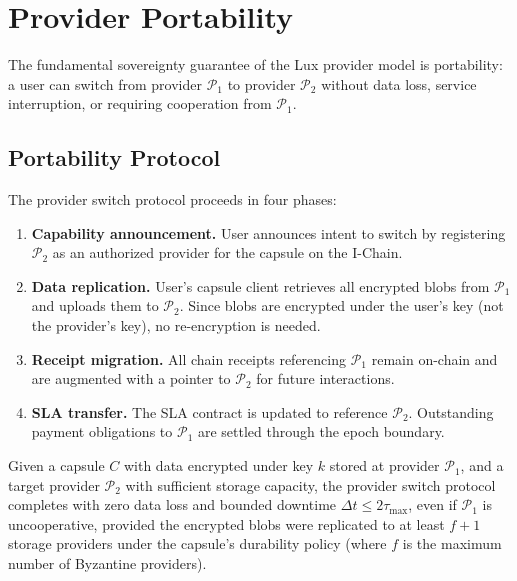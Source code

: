 \section{Provider Portability}
\label{sec:portability}

The fundamental sovereignty guarantee of the Lux provider model is
portability: a user can switch from provider $\mathcal{P}_1$ to
provider $\mathcal{P}_2$ without data loss, service interruption,
or requiring cooperation from $\mathcal{P}_1$.

\subsection{Portability Protocol}

The provider switch protocol proceeds in four phases:

\begin{enumerate}
    \item \textbf{Capability announcement.} User announces intent to switch
    by registering $\mathcal{P}_2$ as an authorized provider for the capsule
    on the I-Chain.

    \item \textbf{Data replication.} User's capsule client retrieves all
    encrypted blobs from $\mathcal{P}_1$ and uploads them to $\mathcal{P}_2$.
    Since blobs are encrypted under the user's key (not the provider's key),
    no re-encryption is needed.

    \item \textbf{Receipt migration.} All chain receipts referencing
    $\mathcal{P}_1$ remain on-chain and are augmented with a pointer to
    $\mathcal{P}_2$ for future interactions.

    \item \textbf{SLA transfer.} The SLA contract is updated to reference
    $\mathcal{P}_2$. Outstanding payment obligations to $\mathcal{P}_1$
    are settled through the epoch boundary.
\end{enumerate}

\begin{theorem}\label{thm:portability}
Given a capsule $C$ with data encrypted under key $k$ stored at provider
$\mathcal{P}_1$, and a target provider $\mathcal{P}_2$ with sufficient
storage capacity, the provider switch protocol completes with zero data
loss and bounded downtime $\Delta t \leq 2\tau_{\max}$, even if
$\mathcal{P}_1$ is uncooperative, provided the encrypted blobs were
replicated to at least $f + 1$ storage providers under the capsule's
durability policy (where $f$ is the maximum number of Byzantine providers).
\end{theorem}

